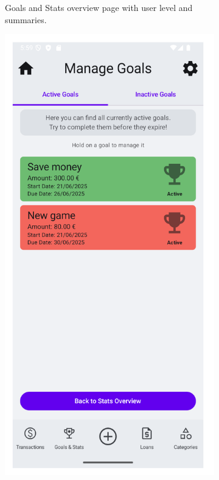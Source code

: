 \documentclass[a4paper,12pt]{article}
\begin{document}
\begin{figure}[H]
\begin{subfigure}[b]{0.23\textwidth}
        \caption{Goals and Stats overview page with user level and summaries.}
        \label{fig:goals_stats_overview}
    \end{subfigure}
    \hfill
    \begin{subfigure}[b]{0.23\textwidth}
        \includegraphics[width=\textwidth]{manage_goals_active.png}

\end{subfigure}
\end{figure}
\end{document}
